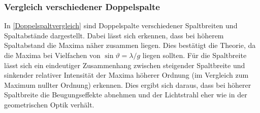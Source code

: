 \documentclass[
	a4paper,
	12pt,
	pagesize,
	ngerman
]{scrartcl}
\begin{document}
	\subsubsection{Vergleich verschiedener Doppelspalte}
	In \cref{Doppelspaltvergleich} sind Doppelspalte verschiedener Spaltbreiten und Spaltabstände dargestellt.
	Dabei lässt sich erkennen, dass bei höherem Spaltabstand die Maxima näher zusammen liegen.
	Dies bestätigt die Theorie, da die Maxima bei Vielfachen von $\sin \vartheta = \lambda /g $ liegen sollten. \label{Doppelspalttheo}
	Für die Spaltbreite lässt sich ein eindeutiger Zusammenhang zwischen steigender Spaltbreite und sinkender relativer Intensität der Maxima höherer Ordnung (im Vergleich zum Maximum nullter Ordnung) erkennen.
	Dies ergibt sich daraus, dass bei höherer Spaltbreite die Beugungseffekte abnehmen und der Lichtstrahl eher wie in der geometrischen Optik verhält.
	
\end{document}
